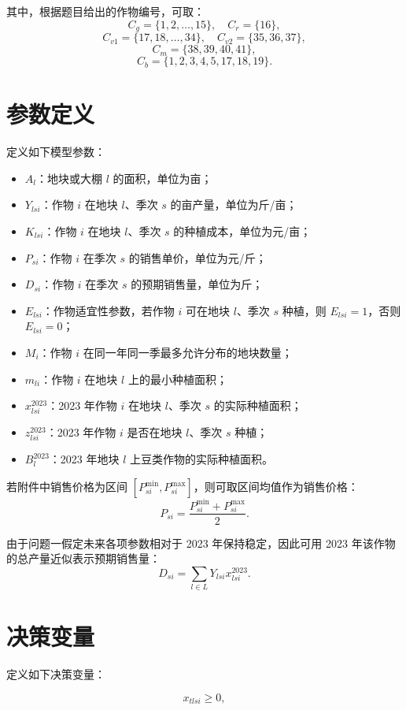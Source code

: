 \documentclass[12pt,a4paper]{ctexart}
\begin{document}
其中，根据题目给出的作物编号，可取：
\[
C_g=\{1,2,\ldots,15\},\quad
C_r=\{16\},
\]
\[
C_{v1}=\{17,18,\ldots,34\},\quad
C_{v2}=\{35,36,37\},
\]
\[
C_m=\{38,39,40,41\},
\]
\[
C_b=\{1,2,3,4,5,17,18,19\}.
\]

\section{参数定义}

定义如下模型参数：

\begin{itemize}[leftmargin=2em]
    \item $A_l$：地块或大棚 $l$ 的面积，单位为亩；
    \item $Y_{lsi}$：作物 $i$ 在地块 $l$、季次 $s$ 的亩产量，单位为斤/亩；
    \item $K_{lsi}$：作物 $i$ 在地块 $l$、季次 $s$ 的种植成本，单位为元/亩；
    \item $P_{si}$：作物 $i$ 在季次 $s$ 的销售单价，单位为元/斤；
    \item $D_{si}$：作物 $i$ 在季次 $s$ 的预期销售量，单位为斤；
    \item $E_{lsi}$：作物适宜性参数，若作物 $i$ 可在地块 $l$、季次 $s$ 种植，则 $E_{lsi}=1$，否则 $E_{lsi}=0$；
    \item $M_i$：作物 $i$ 在同一年同一季最多允许分布的地块数量；
    \item $m_{li}$：作物 $i$ 在地块 $l$ 上的最小种植面积；
    \item $x^{2023}_{lsi}$：2023 年作物 $i$ 在地块 $l$、季次 $s$ 的实际种植面积；
    \item $z^{2023}_{lsi}$：2023 年作物 $i$ 是否在地块 $l$、季次 $s$ 种植；
    \item $B^{2023}_l$：2023 年地块 $l$ 上豆类作物的实际种植面积。
\end{itemize}

若附件中销售价格为区间 $[P^{\min}_{si},P^{\max}_{si}]$，则可取区间均值作为销售价格：
\[
P_{si}=\frac{P^{\min}_{si}+P^{\max}_{si}}{2}.
\]

由于问题一假定未来各项参数相对于 2023 年保持稳定，因此可用 2023 年该作物的总产量近似表示预期销售量：
\[
D_{si}=\sum_{l\in L}Y_{lsi}x^{2023}_{lsi}.
\]

\section{决策变量}

定义如下决策变量：

\[
x_{tlsi}\geq 0,
\]
\end{document}
